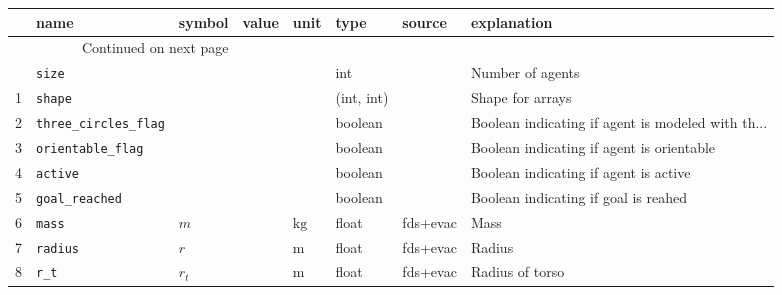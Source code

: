 \begin{tabularx}{1.0\linewidth}{llllllll}
\toprule
{} &                            name &           symbol &                               value &                         unit &        type &     source &                                        explanation \\
\midrule
\endhead
\midrule
\multicolumn{3}{r}{{Continued on next page}} \\
\midrule
\endfoot

\bottomrule
\endlastfoot
0  &                     \verb|size| &                  &                                     &                              &         int &            &                                   Number of agents \\
1  &                    \verb|shape| &                  &                                     &                              &  (int, int) &            &                                   Shape for arrays \\
2  &       \verb|three_circles_flag| &                  &                                     &                              &     boolean &            &  Boolean indicating if agent is modeled with th... \\
3  &          \verb|orientable_flag| &                  &                                     &                              &     boolean &            &         Boolean indicating if agent is orientable  \\
4  &                   \verb|active| &                  &                                     &                              &     boolean &            &              Boolean indicating if agent is active \\
5  &             \verb|goal_reached| &                  &                                     &                              &     boolean &            &               Boolean indicating if goal is reahed \\
6  &                     \verb|mass| &              $m$ &                                     &                $\mathrm{kg}$ &       float &   fds+evac &                                               Mass \\
7  &                   \verb|radius| &              $r$ &                                     &                 $\mathrm{m}$ &       float &   fds+evac &                                             Radius \\
8  &                      \verb|r_t| &          $r_{t}$ &                                     &                 $\mathrm{m}$ &       float &   fds+evac &                                    Radius of torso \\

\end{tabularx}
